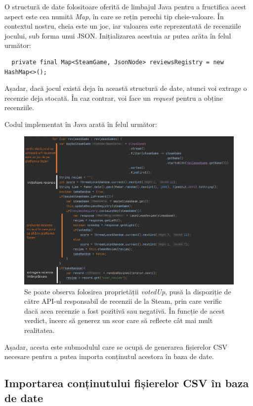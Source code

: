 \documentclass[12pt,a4paper]{report}
\begin{document}
O structură de date folositoare oferită de limbajul Java pentru a fructifica acest aspect este cea numită \emph{Map}, în care se rețin perechi tip cheie-valoare. În contextul nostru, cheia este un joc, iar valoarea este reprezentată de recenziile jocului, sub forma unui JSON. Inițializarea acestuia ar putea arăta în felul următor:

\begin{verbatim}
  private final Map<SteamGame, JsonNode> reviewsRegistry = new HashMap<>();
\end{verbatim}

Așadar, dacă jocul există deja în această structură de date, atunci voi extrage o recenzie deja stocată. În caz contrar, voi face un \emph{request} pentru a obține recenziile.

Codul implementat în Java arată în felul următor:

\begin{figure}[H]
\centering
\caption{}
\includegraphics[scale = 0.7]{exemplu_14_review_code_java}
\caption*{Se poate observa folosirea proprietății \emph{votedUp}, pusă la dispoziție de către API-ul responsabil de recenzii de la Steam, prin care verific dacă acea recenzie a fost pozitivă sau negativă. În funcție de acest verdict, încerc să generez un scor care să reflecte cât mai mult realitatea.}
\end{figure}

Așadar, acesta este submodulul care se ocupă de generarea fișierelor CSV necesare pentru a putea importa conținutul acestora în baza de date.

\subsection{Importarea conținutului fișierelor CSV în baza de date}
\end{document}
